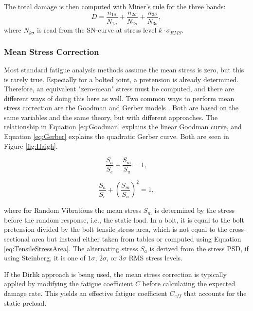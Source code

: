\documentclass[a4paper,twoside]{bth}
\begin{document}
The total damage is then computed with Miner's rule for the three bands:
\begin{equation}
    D = \frac{n_{1\sigma}}{N_{1\sigma}} + \frac{n_{2\sigma}}{N_{2\sigma}} + \frac{n_{3\sigma}}{N_{3\sigma}},
\end{equation}
where $N_{k\sigma}$ is read from the SN-curve at stress level $k\cdot \sigma_{RMS}$.

\subsubsection{Mean Stress Correction}
Most standard fatigue analysis methods assume the mean stress is zero, but this is rarely true. Especially for a bolted joint, a pretension is already determined. Therefore, an equivalent "zero-mean" stress must be computed, and there are different ways of doing this here as well. Two common ways to perform mean stress correction are the Goodman and Gerber models \cite{budynas_shigleys_2015}. Both are based on the same variables and the same theory, but with different approaches. The relationship in Equation \ref{eq:Goodman} explains the linear Goodman curve, and Equation \ref{eq:Gerber} explains the quadratic Gerber curve. Both are seen in Figure \ref{fig:Haigh}.

\begin{equation} \label{eq:Goodman}
    \frac{S_a}{S_e} + \frac{S_m}{S_u} = 1,
\end{equation}

\begin{equation} \label{eq:Gerber}
    \frac{S_a}{S_e} + \left(\frac{S_m}{S_u}\right)^2 = 1,
\end{equation}

where for Random Vibrations the mean stress $S_m$ is determined by the stress before the random response, i.e., the static load. In a bolt, it is equal to the bolt pretension divided by the bolt tensile stress area, which is not equal to the cross-sectional area but instead either taken from tables or computed using Equation \ref{eq:TensileStressArea}. The alternating stress $S_a$ is derived from the stress \ac{PSD}, if using Steinberg, it is one of $1\sigma$, $2\sigma$, or $3\sigma$ \ac{RMS} stress levels.

If the Dirlik approach is being used, the mean stress correction is typically applied by modifying the fatigue coefficient $C$ before calculating the expected damage rate. This yields an effective fatigue coefficient $C_{eff}$ that accounts for the static preload.
\end{document}
